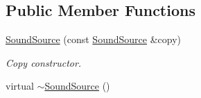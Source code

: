 \subsection*{Public Member Functions}
\begin{DoxyCompactItemize}
\item 
\hyperlink{classsf_1_1SoundSource_ae0c7728c1449fdebe65749ab6fcb3170}{Sound\-Source} (const \hyperlink{classsf_1_1SoundSource}{Sound\-Source} \&copy)
\begin{DoxyCompactList}\small\item\em Copy constructor. \end{DoxyCompactList}\item 
\hypertarget{classsf_1_1SoundSource_a77c7c1524f8cb81df2de9375b0f87c5c}{virtual \hyperlink{classsf_1_1SoundSource_a77c7c1524f8cb81df2de9375b0f87c5c}{$\sim$\-Sound\-Source} ()}\label{classsf_1_1SoundSource_a77c7c1524f8cb81df2de9375b0f87c5c}


\end{DoxyCompactItemize}
